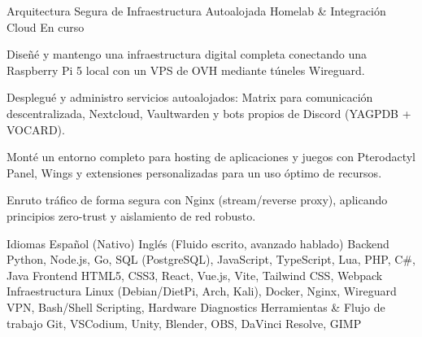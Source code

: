 \documentclass[11pt, a4paper]{awesome-cv}
\begin{document}
\begin{cventries}
  \cventry
    {Arquitectura Segura de Infraestructura Autoalojada} %
    {Homelab \& Integración Cloud} %
    {} %
    {En curso} %
    {
      \begin{cvitems} %
        \item {Diseñé y mantengo una infraestructura digital completa conectando una Raspberry Pi 5 local con un VPS de OVH mediante túneles Wireguard.}
        \item {Desplegué y administro servicios autoalojados: Matrix para comunicación descentralizada, Nextcloud, Vaultwarden y bots propios de Discord (YAGPDB + VOCARD).}
        \item {Monté un entorno completo para hosting de aplicaciones y juegos con Pterodactyl Panel, Wings y extensiones personalizadas para un uso óptimo de recursos.}
        \item {Enruto tráfico de forma segura con Nginx (stream/reverse proxy), aplicando principios zero-trust y aislamiento de red robusto.}
      \end{cvitems}
    }
\end{cventries}


\begin{cvskills}
  \cvskill
    {Idiomas}
    {Español (Nativo) \enskip\cdotp\enskip Inglés (Fluido escrito, avanzado hablado)}
  \cvskill
    {Backend}
    {Python, Node.js, Go, SQL (PostgreSQL), JavaScript, TypeScript, Lua, PHP, C\#, Java}
  \cvskill
    {Frontend}
    {HTML5, CSS3, React, Vue.js, Vite, Tailwind CSS, Webpack}
  \cvskill
    {Infraestructura}
    {Linux (Debian/DietPi, Arch, Kali), Docker, Nginx, Wireguard VPN, Bash/Shell Scripting, Hardware Diagnostics}
  \cvskill
    {Herramientas \& Flujo de trabajo}
    {Git, VSCodium, Unity, Blender, OBS, DaVinci Resolve, GIMP}
\end{cvskills}
\end{document}
